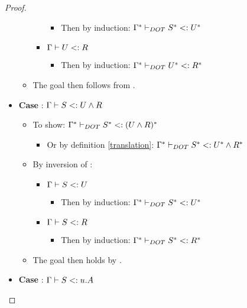 \begin{proof}
\begin{itemize}
\begin{itemize}
\begin{itemize}
\begin{itemize}
                    \item Then by induction:
                        $\Gamma^{*} \vdash_{DOT} S^{*} <: U^{*}$
                \end{itemize}
                \item $\Gamma \vdash U <: R$
                \begin{itemize}
                    \item Then by induction:
                        $\Gamma^{*} \vdash_{DOT} U^{*} <: R^{*}$
                \end{itemize}
            \end{itemize}
            \item The goal then follows from .
        \end{itemize}
        \item \textbf{Case} : $\Gamma \vdash S <: U \wedge R$
        \begin{itemize}
            \item To show:
                $\Gamma^{*} \vdash_{DOT} S^{*} <: (U \wedge R)^{*}$
            \begin{itemize}
                \item Or by definition \ref{translation}: $\Gamma^{*} \vdash_{DOT} S^{*} <: U^{*} \wedge R^{*}$
            \end{itemize}
            \item By inversion of :
            \begin{itemize}
                \item $\Gamma \vdash S <: U$
                \begin{itemize}
                    \item Then by induction:
                        $\Gamma^{*} \vdash_{DOT} S^{*} <: U^{*}$
                \end{itemize}
                \item $\Gamma \vdash S <: R$
                \begin{itemize}
                    \item Then by induction:
                        $\Gamma^{*} \vdash_{DOT} S^{*} <: R^{*}$
                \end{itemize}
            \end{itemize}
            \item The goal then holds by .
        \end{itemize}
        \item \textbf{Case} : $\Gamma \vdash S <: u.A$

\end{itemize}
\end{proof}
